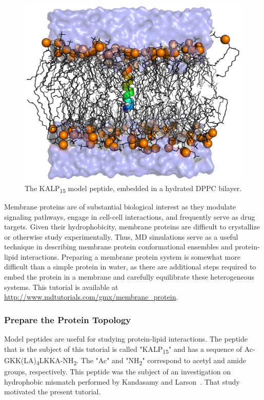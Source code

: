 \documentclass[9pt,tutorial]{livecoms}
\newcommand{\urlstring}{http://www.mdtutorials.com/gmx}
\newcommand{\tutorialkalp}{\url{\urlstring/membrane_protein}}
\begin{document}
\begin{figure}[H]
\centering
\includegraphics{kalp15_dppc}
\caption{The KALP\textsubscript{15} model peptide, embedded in a hydrated DPPC bilayer.}
\label{kalp_dppc_fig}
\end{figure}

Membrane proteins are of substantial biological interest as they modulate signaling pathways, engage in cell-cell interactions, and frequently serve as drug targets. Given their hydrophobicity, membrane proteins are difficult to crystallize or otherwise study experimentally. Thus, MD simulations serve as a useful technique in describing membrane protein conformational ensembles and protein-lipid interactions. Preparing a membrane protein system is somewhat more difficult than a simple protein in water, as there are additional steps required to embed the protein in a membrane and carefully equilibrate these heterogeneous systems. This tutorial is available at \tutorialkalp.

\subsubsection{Prepare the Protein Topology} \label{kalp_protein_topology}

Model peptides are useful for studying protein-lipid interactions. The peptide that is the subject of this tutorial is called "KALP\textsubscript{15}" and has a sequence of Ac-GKK(LA)\textsubscript{4}LKKA-NH\textsubscript{2}. The "Ac" and "NH\textsubscript{2}" correspond to acetyl and amide groups, respectively. This peptide was the subject of an investigation on hydrophobic mismatch performed by Kandasamy and Larson~\cite{Kandasamy2006}. That study motivated the present tutorial.
\end{document}
